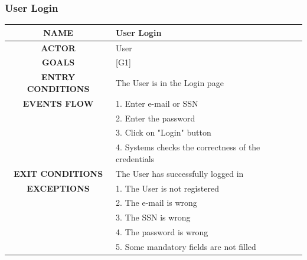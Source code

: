 \documentclass[12pt,a4paper]{article}
\begin{document}
		\subsubsection{User Login}
		\begin{center}
			\begin{tabular}{| c | l |}
				\hline
				\textbf{NAME} & User Login \\
				\hline
				\textbf{ACTOR} & User \\
				\hline
				\textbf{GOALS} & [G1] \\
				\hline
				\textbf{ENTRY CONDITIONS} & The User is in the Login page \\ \hline
				\textbf{EVENTS FLOW}  &
				1. Enter e-mail or SSN\\
				&2. Enter the password\\
				&3. Click on "Login" button\\
				&4. Systems checks the correctness of the credentials\\
				\hline
				\textbf{EXIT CONDITIONS}  & The User has successfully logged in \\ \hline
				\textbf{EXCEPTIONS} &
				1. The User is not registered\\
				&2. The e-mail is wrong\\
				&3. The SSN is wrong\\
				&4. The password is wrong\\
				&5. Some mandatory fields are not filled\\
				\hline
			\end{tabular}
		\end{center}
\end{document}
